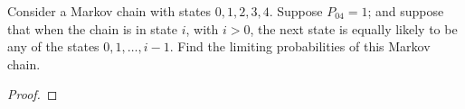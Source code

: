 \begin{problem}{4.35}
  Consider a Markov chain with states $0, 1, 2, 3, 4$. Suppose $P_{04} = 1$; and suppose
  that when the chain is in state $i$, with $i > 0$, the next state is equally
  likely to be any of the states $0, 1, \dots, i-1$. Find the limiting probabilities of
  this Markov chain.
\end{problem}

\begin{proof}
\end{proof}
\newpage
